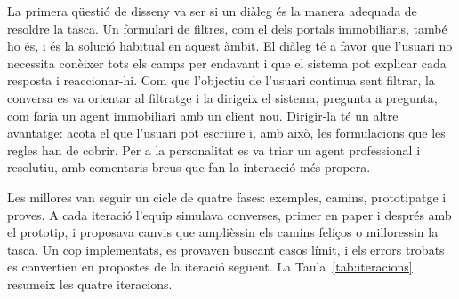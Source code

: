 \documentclass[10pt,a4paper]{article}
\begin{document}
La primera qüestió de disseny va ser si un diàleg és la manera adequada de resoldre la tasca. Un formulari de filtres, com el dels portals immobiliaris, també ho és, i és la solució habitual en aquest àmbit. El diàleg té a favor que l'usuari no necessita conèixer tots els camps per endavant i que el sistema pot explicar cada resposta i reaccionar-hi. Com que l'objectiu de l'usuari continua sent filtrar, la conversa es va orientar al filtratge i la dirigeix el sistema, pregunta a pregunta, com faria un agent immobiliari amb un client nou. Dirigir-la té un altre avantatge: acota el que l'usuari pot escriure i, amb això, les formulacions que les regles han de cobrir. Per a la personalitat es va triar un agent professional i resolutiu, amb comentaris breus que fan la interacció més propera.

Les millores van seguir un cicle de quatre fases: exemples, camins, prototipatge i proves. A cada iteració l'equip simulava converses, primer en paper i després amb el prototip, i proposava canvis que amplièssin els camins feliços o milloressin la tasca. Un cop implementats, es provaven buscant casos límit, i els errors trobats es convertien en propostes de la iteració següent. La Taula~\ref{tab:iteracions} resumeix les quatre iteracions.
\end{document}

